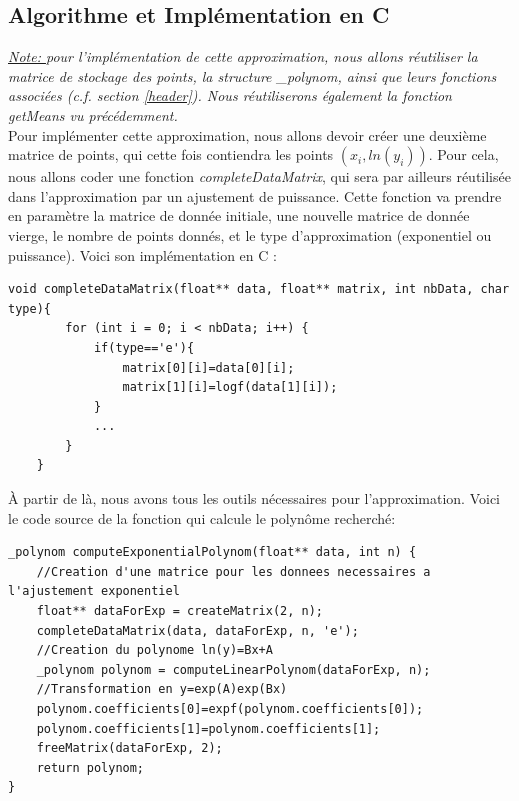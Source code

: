 \subsection{Algorithme et Implémentation en C}
\textit{\underline{Note: } pour l'implémentation de cette approximation, nous allons réutiliser la matrice de stockage des points, la structure \_polynom, ainsi que leurs fonctions associées (c.f. section \ref{header}). Nous réutiliserons également la fonction getMeans vu précédemment.}\vspace{5pt}\\
Pour implémenter cette approximation, nous allons devoir créer une deuxième matrice de points, qui cette fois contiendra les points $(x_i, ln(y_i))$. Pour cela, nous allons coder une fonction \textit{completeDataMatrix}, qui sera par ailleurs réutilisée dans l'approximation par un ajustement de puissance. Cette fonction va prendre en paramètre la matrice de donnée initiale, une nouvelle matrice de donnée vierge, le nombre de points donnés, et le type d'approximation (exponentiel ou puissance). Voici son implémentation en C :\\
\begin{lstlisting}[mathescape=true, basicstyle=\fontsize{8}{10}\selectfont]
    void completeDataMatrix(float** data, float** matrix, int nbData, char type){
        for (int i = 0; i < nbData; i++) {
            if(type=='e'){
                matrix[0][i]=data[0][i];
                matrix[1][i]=logf(data[1][i]);
            }
            ...
        }
    }       
\end{lstlisting}
À partir de là, nous avons tous les outils nécessaires pour l'approximation. Voici le code source de la fonction qui calcule le polynôme recherché:\\
\begin{lstlisting}[mathescape=true, basicstyle=\fontsize{8}{10}\selectfont]
_polynom computeExponentialPolynom(float** data, int n) {
    //Creation d'une matrice pour les donnees necessaires a l'ajustement exponentiel
    float** dataForExp = createMatrix(2, n);
    completeDataMatrix(data, dataForExp, n, 'e');
    //Creation du polynome ln(y)=Bx+A
    _polynom polynom = computeLinearPolynom(dataForExp, n);
    //Transformation en y=exp(A)exp(Bx)
    polynom.coefficients[0]=expf(polynom.coefficients[0]);
    polynom.coefficients[1]=polynom.coefficients[1];
    freeMatrix(dataForExp, 2);
    return polynom;
}
\end{lstlisting}
\newpage
